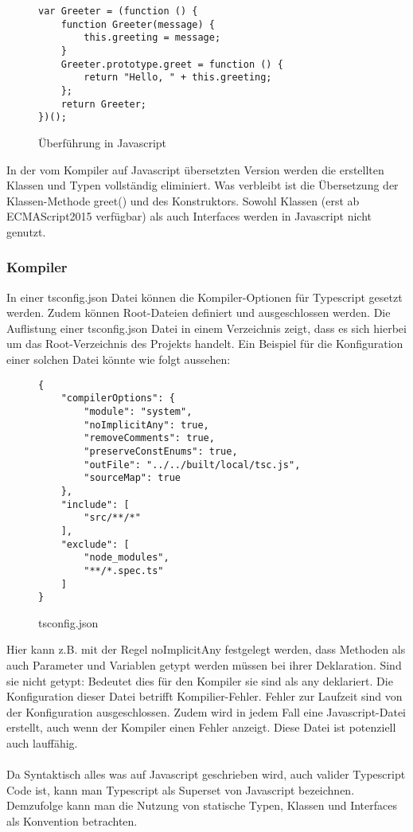 \begin{figure}[t]
\begin{lstlisting}
var Greeter = (function () {
    function Greeter(message) {
        this.greeting = message;
    }
    Greeter.prototype.greet = function () {
        return "Hello, " + this.greeting;
    };
    return Greeter;
})(); 
\end{lstlisting}
\caption{Überführung in Javascript \cite{typescript-example}}
\end{figure}

\noindent
In der vom Kompiler auf Javascript übersetzten Version werden die erstellten Klassen und Typen vollständig eliminiert. Was verbleibt ist die Übersetzung der Klassen-Methode greet() und des Konstruktors. Sowohl Klassen (erst ab ECMAScript2015 verfügbar) als auch Interfaces werden in Javascript nicht genutzt.

\subsubsection{Kompiler}
In einer tsconfig.json Datei können die Kompiler-Optionen für Typescript gesetzt werden. Zudem können Root-Dateien definiert und ausgeschlossen werden. Die Auflistung einer tsconfig.json Datei in einem Verzeichnis zeigt, dass es sich hierbei um das Root-Verzeichnis des Projekts handelt. Ein Beispiel für die Konfiguration einer solchen Datei könnte wie folgt aussehen: 

\begin{figure}[h!]
\begin{lstlisting}
{
    "compilerOptions": {
        "module": "system",
        "noImplicitAny": true,
        "removeComments": true,
        "preserveConstEnums": true,
        "outFile": "../../built/local/tsc.js",
        "sourceMap": true
    },
    "include": [
        "src/**/*"
    ],
    "exclude": [
        "node_modules",
        "**/*.spec.ts"
    ]
}  
\end{lstlisting}
\caption{tsconfig.json \cite{tsconfig}}
\end{figure}

\noindent
Hier kann z.B. mit der Regel \glqq noImplicitAny\grqq{} festgelegt werden, dass Methoden als auch Parameter und Variablen getypt werden müssen bei ihrer Deklaration. Sind sie nicht getypt: Bedeutet dies für den Kompiler sie sind als any deklariert.
\noindent
Die Konfiguration dieser Datei betrifft Kompilier-Fehler. Fehler zur Laufzeit sind von der Konfiguration ausgeschlossen. Zudem wird in jedem Fall eine Javascript-Datei erstellt, auch wenn der Kompiler einen Fehler anzeigt. Diese Datei ist potenziell auch lauffähig.\\\\
\noindent
Da Syntaktisch alles was auf Javascript geschrieben wird, auch valider Typescript Code ist, kann man Typescript als Superset von Javascript bezeichnen. Demzufolge kann man die Nutzung von statische Typen, Klassen und Interfaces als Konvention betrachten.

